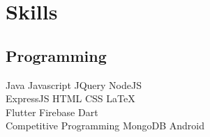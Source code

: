 \documentclass[]{deedy-resume-openfont}
\begin{document}
\begin{minipage}[t]{0.33\textwidth}

\section{Skills}
\subsection{Programming}

Java \textbullet{}   Javascript \textbullet{} JQuery \textbullet{} NodeJS \\
ExpressJS \textbullet{} HTML \textbullet{} CSS \textbullet{} \LaTeX\ \\ 

Flutter\textbullet{} Firebase \textbullet{} Dart\\
Competitive Programming \textbullet{} MongoDB \textbullet{} Android 
\sectionsep

%
%

\end{minipage} 
\hfill
\end{document}
